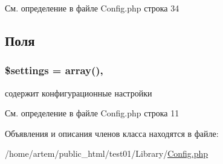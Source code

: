 См. определение в файле Config.\-php строка 34



\subsection{Поля}
\hypertarget{class_config_ac7c3353107070daa85f641882931b358}{
\subsubsection[{\$settings}]{\setlength{\rightskip}{0pt plus 5cm}\$settings = array()\hspace{0.3cm}{\ttfamily [static]}, {\ttfamily [protected]}}}\label{class_config_ac7c3353107070daa85f641882931b358}


содержит конфигурационные настройки 



См. определение в файле Config.\-php строка 11



Объявления и описания членов класса находятся в файле\-:\begin{DoxyCompactItemize}
\item 
/home/artem/public\-\_\-html/test01/\-Library/\hyperlink{_config_8php}{Config.\-php}\end{DoxyCompactItemize}
